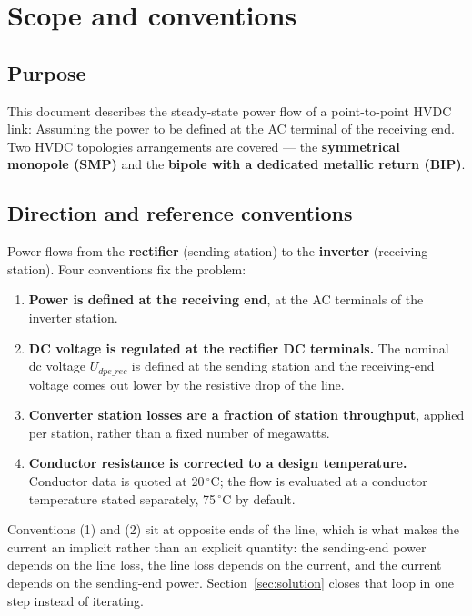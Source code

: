 \section{Scope and conventions}

\subsection{Purpose}
This document describes the steady-state power flow of a point-to-point HVDC
link: Assuming the power to be defined at the AC terminal of the receiving end. Two HVDC topologies 
arrangements are covered --- the \textbf{symmetrical
monopole (SMP)} and the \textbf{bipole with a dedicated metallic return (BIP)}.

\subsection{Direction and reference conventions}
Power flows from the \textbf{rectifier} (sending station) to the
\textbf{inverter} (receiving station). Four conventions fix the problem:

\begin{enumerate}[label=(\arabic*)]
  \item \textbf{Power is defined at the receiving end}, at the AC terminals of
        the inverter station.
  \item \textbf{DC voltage is regulated at the rectifier DC terminals.} The
        nominal dc voltage $U_{dpe\_rec}$ is defined at the sending station and
        the receiving-end voltage comes out lower by the resistive drop of the line.
  \item \textbf{Converter station losses are a fraction of station throughput}, applied per station, rather than a fixed number of
        megawatts.
  \item \textbf{Conductor resistance is corrected to a design temperature.}
        Conductor data is quoted at 20\,$^{\circ}$C; the flow is evaluated at a
        conductor temperature stated separately, 75\,$^{\circ}$C by default.
\end{enumerate}

Conventions (1) and (2) sit at opposite ends of the line, which is what makes
the current an implicit rather than an explicit quantity: the sending-end power
depends on the line loss, the line loss depends on the current, and the current
depends on the sending-end power. Section~\ref{sec:solution} closes that loop
in one step instead of iterating.

